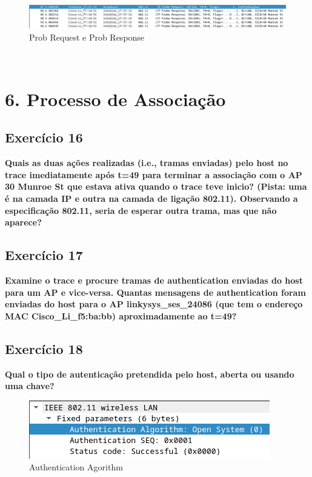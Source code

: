\documentclass[a4paper]{report}
\begin{document}
\begin{figure}[H]
    \centering 
    \includegraphics[width=\textwidth]{images/probEx15.png}  
    \caption{Prob Request e Prob Response}
    \label{fig:probEx15}
\end{figure}\\

\chapter{6. Processo de Associação}
\section{Exercício 16}
\textbf{Quais as duas ações realizadas (i.e., tramas enviadas) pelo host no
    trace imediatamente após t=49 para terminar a associação com o AP 30 Munroe
    St que estava ativa quando o trace teve inicio? (Pista: uma é na camada IP e
    outra na camada de ligação 802.11). Observando a especificação 802.11, seria
    de esperar outra trama, mas que não aparece?}\\

\section{Exercício 17}
\textbf{Examine o trace e procure tramas de authentication enviadas do host para
    um AP e vice-versa. Quantas mensagens de authentication foram enviadas do
    host para o AP linkysys\_ses\_24086 (que tem o endereço MAC
    Cisco\_Li\_f5:ba:bb) aproximadamente ao t=49?}\\

\section{Exercício 18}
\textbf{Qual o tipo de autenticação pretendida pelo host, aberta ou usando uma
    chave?}\\

\begin{figure}[H]
    \centering 
    \includegraphics[width=\textwidth]{images/authenticationEx18.png}  
    \caption{Authentication Agorithm}
    \label{fig:authenticationEx18}
\end{figure}\\
\end{document}
